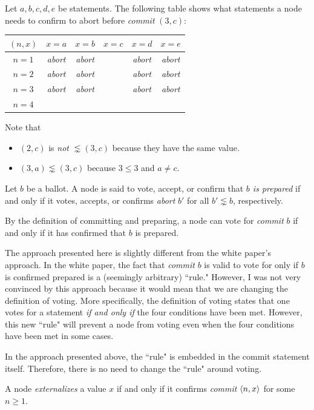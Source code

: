 \begin{exmp}
    Let $a, b, c, d, e$ be statements.
    The following table shows what statements a node needs to confirm to abort before \textit{commit} $(3, c)$:
    \begin{center}
        \begin{tabular}{|c|c|c|c|c|c|}
            \hline
            $(n, x)$ & $x = a$        & $x = b$        & $x = c$ & $x = d$        & $x = e$        \\ \hline
            $n = 1$  & \textit{abort} & \textit{abort} &         & \textit{abort} & \textit{abort} \\ \hline
            $n = 2$  & \textit{abort} & \textit{abort} &         & \textit{abort} & \textit{abort} \\ \hline
            $n = 3$  & \textit{abort} & \textit{abort} &         & \textit{abort} & \textit{abort} \\ \hline
            $n = 4$  &                &                &         &                &                \\ \hline
        \end{tabular}
    \end{center}

    Note that
    \begin{itemize}
        \item
            $(2, c)$ is \textit{not} $\lnsim (3, c)$ because they have the same value.
        \item
            $(3, a) \lnsim (3, c)$ because $3 \leq 3$ and $a \ne c$.
    \end{itemize}
\end{exmp}

\begin{defn}[Prepare]
    Let $b$ be a ballot.
    A node is said to vote, accept, or confirm that \textit{$b$ is prepared} if and only if it votes, accepts, or confirms \textit{abort} $b'$ for all $b' \lnsim b$, respectively.
\end{defn}

\begin{rem}
    By the definition of committing and preparing, a node can vote for \textit{commit} $b$ if and only if it has confirmed that $b$ is prepared.
\end{rem}

\begin{rem}
    The approach presented here is slightly different from the white paper's approach.
    In the white paper, the fact that \textit{commit} $b$ is valid to vote for only if $b$ is confirmed prepared is a (seemingly arbitrary) ``rule."
    However, I was not very convinced by this approach because it would mean that we are changing the definition of voting.
    More specifically, the definition of voting states that one votes for a statement \textit{if and only if} the four conditions have been met.  
    However, this new ``rule" will prevent a node from voting even when the four conditions have been met in some cases.

    In the approach presented above, the ``rule" is embedded in the commit statement itself.
    Therefore, there is no need to change the ``rule" around voting.
\end{rem}

\begin{defn}[Externalize]
    A node \textit{externalizes} a value $x$ if and only if it confirms \textit{commit} $\ev{n, x}$ for some $n \geq 1$.
\end{defn}
